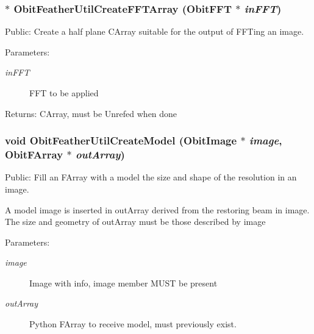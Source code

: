\subsubsection{$\ast$ Obit\-Feather\-Util\-Create\-FFTArray ({\bf Obit\-FFT} $\ast$ {\em in\-FFT})}\label{ObitFeatherUtil_8h_a2}


Public: Create a half plane CArray suitable for the output of FFTing an image. 

\begin{Desc}
\item[Parameters:]
\begin{description}
\item[{\em in\-FFT}]FFT to be applied \end{description}
\end{Desc}
\begin{Desc}
\item[Returns:]CArray, must be Unrefed when done \end{Desc}
\subsubsection{\setlength{\rightskip}{0pt plus 5cm}void Obit\-Feather\-Util\-Create\-Model ({\bf Obit\-Image} $\ast$ {\em image}, {\bf Obit\-FArray} $\ast$ {\em out\-Array})}\label{ObitFeatherUtil_8h_a8}


Public: Fill an FArray with a model the size and shape of the resolution in an image. 

A model image is inserted in out\-Array derived from the restoring beam in image. The size and geometry of out\-Array must be those described by image \begin{Desc}
\item[Parameters:]
\begin{description}
\item[{\em image}]Image with info, image member MUST be present \item[{\em out\-Array}]Python FArray to receive model, must previously exist. \end{description}
\end{Desc}
